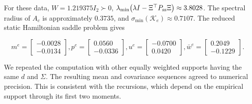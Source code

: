 \documentclass[10pt,journal,twoside]{IEEEtran}
\theoremstyle{definition}
\theoremstyle{remark}
\begin{document}
\begin{table}[!t]
\centering
\caption{Equal-weight empirical support used in the
two-dimensional example}
\label{tab:numerical-support}
\end{table}

For these data, $W=1.219375I_2\succ0$, $\lambda_{\min}
\bigl(\lambda I-\Xi^\top P_{\rm ss}\Xi\bigr)
\approx3.8028$.
The spectral radius of \(A_c\) is approximately \(0.3735\), and
\(\sigma_{\min}(\mathcal K_e)\approx0.7107\). The reduced static Hamiltonian saddle problem gives
\begin{small}
    \[
m^e\!\!=\!\!\begin{bmatrix}-0.0028\\-0.0134\end{bmatrix}\!,
p^e\!\!=\!\!\begin{bmatrix}0.0560\\-0.0336\end{bmatrix}\!,
u^e\!\!=\!\!\begin{bmatrix}-0.0700\\0.0420\end{bmatrix}\!,
\bar w^e\!\!=\!\!\begin{bmatrix}0.2049\\-0.1229\end{bmatrix}\!.
\]
\end{small}
We repeated the computation with other equally weighted supports having the
same \(d\) and \(\Sigma\). The resulting mean and covariance sequences agreed
to numerical precision. This is consistent with the recursions, which depend
on the empirical support through its first two moments.
\end{document}
